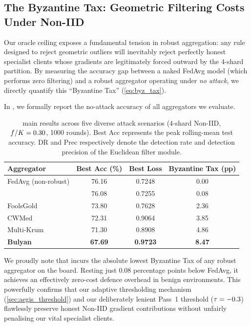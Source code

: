 \documentclass[../main.tex]{subfiles}
\begin{document}
\subsection{The Byzantine Tax: Geometric Filtering Costs Under Non-IID}
\label{sec:results_byz_tax}

Our oracle ceiling exposes a fundamental tension in robust aggregation: any rule designed to reject geometric outliers will inevitably reject perfectly honest specialist clients whose gradients are legitimately forced outward by the 4-shard partition. By measuring the accuracy gap between a naked FedAvg model (which performs zero filtering) and a robust aggregator operating under \emph{no attack}, we directly quantify this ``Byzantine Tax'' (\cref{eq:byz_tax}).

In , we formally report the no-attack accuracy of all aggregators we evaluate.

\begin{table}[htbp]
\centering
\caption[\aegis{} main results across five diverse attack scenarios]{\aegis{} main results across five diverse attack scenarios (4-shard Non-IID, $f/K=0.30$, 1000 rounds). Best Acc represents the peak rolling-mean test accuracy. DR and Prec respectively denote the detection rate and detection precision of the Euclidean filter module.}
\label{tab:no_attack_comparison}
\begin{tabular}{lccc}
\toprule
\textbf{Aggregator} & \textbf{Best Acc (\%)} & \textbf{Best Loss} & \textbf{Byzantine Tax (pp)} \\
\midrule
FedAvg (non-robust) & 76.16 & 0.7248 & 0.00 \\
\aegis{}             & 76.08 & 0.7255 & 0.08 \\
FoolsGold           & 73.80 & 0.7628 & 2.36 \\
CWMed               & 72.31 & 0.9064 & 3.85 \\
Multi-Krum          & 71.30 & 0.8908 & 4.86 \\
\textbf{Bulyan}     & \textbf{67.69} & \textbf{0.9723} & \textbf{8.47} \\
\bottomrule
\end{tabular}
\end{table}

We proudly note that \aegis{} incurs the absolute lowest Byzantine Tax of any robust aggregator on the board. Resting just $0.08$ percentage points below FedAvg, it achieves an effectively zero-cost defence overhead in benign environments. This powerfully confirms that our adaptive thresholding mechanism (\cref{sec:aegis_threshold}) and our deliberately lenient Pass~1 threshold ($\tau = -0.3$) flawlessly preserve honest Non-IID gradient contributions without unfairly penalising our vital specialist clients.
\end{document}

